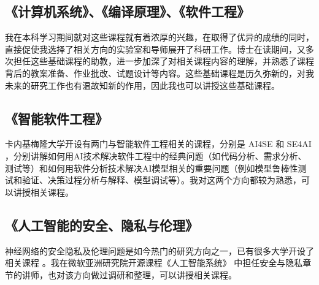 \documentclass[12pt]{article}
\begin{document}
\subsection{《计算机系统》、《编译原理》、《软件工程》}
我在本科学习期间就对这些课程就有着浓厚的兴趣，在取得了优异的成绩的同时，直接促使我选择了相关方向的实验室和导师展开了科研工作。博士在读期间，又多次担任这些基础课程的助教，进一步加深了对相关课程内容的理解，并熟悉了课程背后的教案准备、作业批改、试题设计等内容。这些基础课程是历久弥新的，对我未来的研究工作也有温故知新的作用，因此我也可以讲授这些基础课程。

\subsection{《智能软件工程》}
卡内基梅隆大学开设有两门与智能软件工程相关的课程，分别是 AI4SE \cite{cmu:ai4se} 和 SE4AI \cite{cmu:se4ai}，分别讲解如何用AI技术解决软件工程中的经典问题（如代码分析、需求分析、测试等）和如何用软件分析技术解决AI模型相关的重要问题（例如模型鲁棒性测试和验证、决策过程分析与解释、模型调试等）。我对这两个方向都较为熟悉，可以讲授相关课程。

\subsection{《人工智能的安全、隐私与伦理》}
神经网络的安全隐私及伦理问题是如今热门的研究方向之一，已有很多大学开设了相关课程 \cite{ucb:trustworthy,ucb:fairness}。我在微软亚洲研究院开源课程《人工智能系统》 \cite{microsoft:ai-system}中担任安全与隐私章节的讲师，也对该方向做过调研和整理，可以讲授相关课程。



{


}
\end{document}
